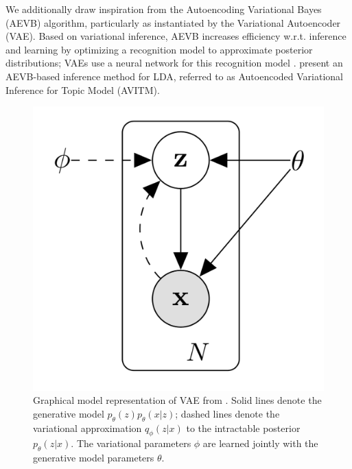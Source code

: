 \documentclass[twoside,twocolumn]{article}
\begin{document}
We additionally draw inspiration from the Autoencoding Variational Bayes (AEVB)
algorithm, particularly as instantiated by the Variational Autoencoder (VAE).
Based on variational inference, AEVB increases efficiency w.r.t. inference and
learning by optimizing a recognition model to approximate posterior
distributions; VAEs use a neural network for this recognition model
\cite{kingma2013auto}.
\cite{srivastava2017autoencoding} present an AEVB-based inference method for
LDA, referred to as Autoencoded Variational Inference for Topic Model (AVITM).

\begin{figure}
\centering
\includegraphics[scale=0.2]{VAEDiagram}
\caption{Graphical model representation of VAE from \cite{kingma2013auto}. Solid lines denote the generative model $p_\theta(z) p_\theta(x|z)$; dashed lines denote the variational approximation $q_\phi(z|x)$ to the intractable posterior $p_\theta(z|x)$. The variational parameters $\phi$ are learned jointly with the generative model parameters $\theta$.
}
\end{figure}



\end{document}
